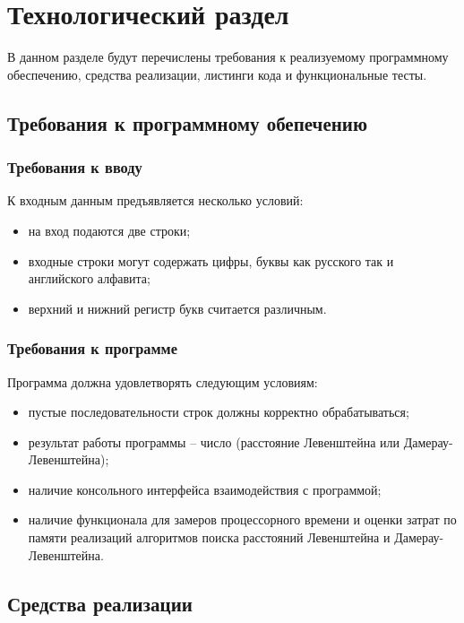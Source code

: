 \chapter{Технологический раздел}

В данном разделе будут перечислены требования к реализуемому программному обеспечению, средства реализации, листинги кода и функциональные тесты.

\section{Требования к программному обепечению}

\subsection{Требования к вводу}

К входным данным предъявляется несколько условий:

\begin{itemize}[label=--]
	\item на вход подаются две строки;
	\item входные строки могут содержать цифры, буквы как русского так и английского алфавита;
	\item верхний и нижний регистр букв считается различным.
\end{itemize}

\subsection{Требования к программе}

Программа должна удовлетворять следующим условиям: 

\begin{itemize}[label=--]
	\item пустые последовательности строк должны корректно обрабатываться;
	\item результат работы программы -- число (расстояние Левенштейна или Дамерау-Левенштейна);
	\item наличие консольного интерфейса взаимодействия с программой;
	\item наличие функционала для замеров процессорного времени и оценки затрат по памяти реализаций алгоритмов поиска расстояний Левенштейна и Дамерау-Левенштейна.
\end{itemize}

\clearpage

\section{Средства реализации}

